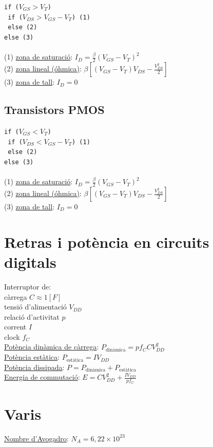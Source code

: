 \documentclass[12pt]{article}
\begin{document}
\begin{multicols}{4}
\texttt{if ($V_{GS} > V_T$) }\\
\texttt{ if ($V_{DS} > V_{GS} - V_T$) (1)} \\
\texttt{ else (2)} \\
\texttt{else (3)} \\
\texttt{ } \\
(1) \underline{zona de saturació}: $I_D = \frac{\beta}{2} (V_{GS}-V_T)^2$ \\
(2) \underline{zona lineal (óhmica)}: $\beta \left[ \left( V_{GS} - V_T \right) V_{DS} - \frac{V_{DS}^2}{2} \right]$ \\
(3) \underline{zona de tall}: $I_D = 0$

\subsection{Transistors PMOS}

\texttt{if ($V_{GS} < V_T$) }\\
\texttt{ if ($V_{DS} < V_{GS} - V_T$) (1)} \\
\texttt{ else (2)} \\
\texttt{else (3)} \\
\texttt{ } \\
(1) \underline{zona de saturació}: $I_D = \frac{\beta}{2} (V_{GS}-V_T)^2$ \\
(2) \underline{zona lineal (óhmica)}: $\beta \left[ \left( V_{GS} - V_T \right) V_{DS} - \frac{V_{DS}^2}{2} \right]$ \\
(3) \underline{zona de tall}: $I_D = 0$

\section{Retras i potència en circuits digitals}

Interruptor de: \\
\qquad càrrega $C \approx 1 [F]$ \\
\qquad tensió d'alimentació $V_{DD}$ \\
\qquad relació d'activitat $p$ \\
\qquad corrent $I$ \\
\qquad clock $f_C$ \\
\underline{Potència dinàmica de càrrega}: $P_{\text{dinàmica}} = p f_C C V_{DD}^2$ \\
\underline{Potència estàtica}: $P_{\text{estàtica}} = I V_{DD}$ \\
\underline{Potència dissipada}: $P = P_{\text{dinàmica}} + P_{\text{estàtica}}$ \\
\underline{Energia de commutació}: $E = C V_{DD}^2 + \frac{I V_{DD}}{p f_C}$

\section{Varis}

\underline{Nombre d'Avogadro}: $N_A = 6,22 \times 10^{23}$ \\

\end{multicols}
\end{document}
